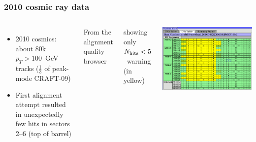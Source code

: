 \documentclass[compress]{beamer}
\begin{document}
\begin{frame}
\frametitle{2010 cosmic ray data}

\begin{columns}
\begin{itemize}
\item 2010 cosmics: about 80k $p_T > 100$~GeV tracks ($\frac{1}{3}$ of
  peak-mode CRAFT-09)

\item First alignment attempt resulted in unexpectedly few hits in
  sectors 2--6 (top of barrel)
\end{itemize}

\vspace{2 cm}

From the alignment quality browser

\vspace{0.2 cm}
showing only $N_{\mbox{\scriptsize hits}} < 5$~warning (in yellow)

\vspace{0.2 cm}
\includegraphics[width=\linewidth]{missing_top_hits.png}
\end{columns}
\end{frame}
\end{document}
